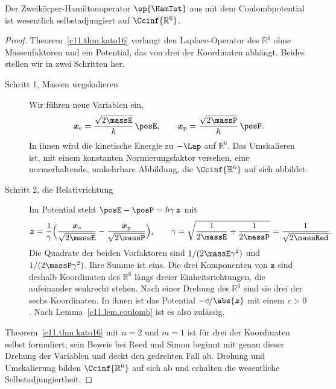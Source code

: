 \begin{fundament}
  \begin{proposition}\label{c11.prop.zweikoerper}
    Der Zweikörper-Hamiltonoperator $\op{\HamTot}$ aus  mit dem Coulombpotential
    ist wesentlich selbstadjungiert auf $\Ccinf{\mathbb{R}^6}$.
  \end{proposition}
  \begin{proof}
    Theorem~\ref{c11.thm.kato16} verlangt den Laplace-Operator des $\mathbb{R}^6$ ohne
    Massenfaktoren und ein Potential, das von drei der Koordinaten abhängt. Beides
    stellen wir in zwei Schritten her.
    \begin{description}
      \item[Schritt 1, Massen wegskalieren] Wir führen neue Variablen ein,
        \begin{equation*}
          \boldsymbol{x}_{\mathrm{e}} = \frac{\sqrt{2\massE}}{\hbar}\,\posE,
          \qquad
          \boldsymbol{x}_{\mathrm{p}} = \frac{\sqrt{2\massP}}{\hbar}\,\posP .
        \end{equation*}
        In ihnen wird die kinetische Energie zu $-\Lap$ auf $\mathbb{R}^6$. Das Umskalieren ist, mit einem konstanten
        Normierungsfaktor versehen, eine normerhaltende, umkehrbare Abbildung, die
        $\Ccinf{\mathbb{R}^6}$ auf sich abbildet.
      \item[Schritt 2, die Relativrichtung] Im Potential steht
        $\posE - \posP = \hbar\gamma\,\boldsymbol{z}$ mit
        \begin{equation}\label{c11.eq.drehung}
          \boldsymbol{z} = \frac{1}{\gamma}\Bigl(
            \frac{\boldsymbol{x}_{\mathrm{e}}}{\sqrt{2\massE}}
            - \frac{\boldsymbol{x}_{\mathrm{p}}}{\sqrt{2\massP}}\Bigr),
          \qquad
          \gamma = \sqrt{\frac{1}{2\massE} + \frac{1}{2\massP}}
                 = \frac{1}{\sqrt{2\massRed}} .
        \end{equation}
        Die Quadrate der beiden Vorfaktoren sind $1/(2\massE\gamma^2)$ und
        $1/(2\massP\gamma^2)$. Ihre Summe ist eins. Die drei Komponenten von
        $\boldsymbol{z}$ sind deshalb Koordinaten des $\mathbb{R}^6$ längs dreier
        Einheitsrichtungen, die aufeinander senkrecht stehen. Nach einer Drehung des
        $\mathbb{R}^6$ sind sie drei der sechs Koordinaten. In ihnen ist das Potential
        $-c/\abs{\boldsymbol{z}}$ mit einem $c > 0$. Nach Lemma~\ref{c11.lem.coulomb}
        ist es also zulässig.
    \end{description}
    Theorem~\ref{c11.thm.kato16} mit $n = 2$ und $m = 1$ ist für drei der Koordinaten
    selbst formuliert; sein Beweis bei Reed und Simon beginnt mit genau dieser Drehung
    der Variablen und deckt den gedrehten Fall ab. Drehung und Umskalierung bilden
    $\Ccinf{\mathbb{R}^6}$ auf sich ab und erhalten die wesentliche Selbstadjungiertheit.
  \end{proof}


\end{fundament}
